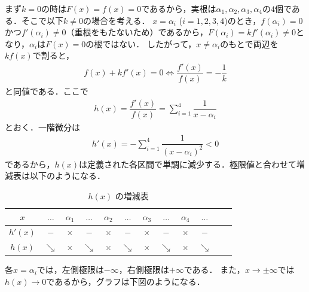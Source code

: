 \documentclass[../../main.tex]{subfiles}
\begin{document}
まず$k=0$の時は$F(x) = f(x) = 0$であるから，実根は$\alpha_1, \alpha_2, \alpha_3, \alpha_4$の$4$個である．そこで以下$k \neq 0$の場合を考える．
$x = \alpha_i$ ($i = 1, 2, 3, 4$)のとき，$f(\alpha_i) = 0$かつ$f'(\alpha_i) \neq 0$（重根をもたないため）であるから，$F(\alpha_i) = kf'(\alpha_i) \neq 0$となり，$\alpha_i$は$F(x) = 0$の根ではない．
したがって，$x \neq \alpha_i$のもとで両辺を$kf(x)$で割ると，
\begin{align}
  f(x) + kf'(x) = 0 \Longleftrightarrow \dfrac{f'(x)}{f(x)} = -\dfrac{1}{k}
\end{align}
と同値である．ここで
\begin{align}
  h(x) = \dfrac{f'(x)}{f(x)} = \sum_{i=1}^4 \dfrac{1}{x - \alpha_i}
\end{align}
とおく．一階微分は
\begin{align}
  h'(x) = -\sum_{i=1}^4 \dfrac{1}{(x - \alpha_i)^2} < 0
\end{align}
であるから，$h(x)$は定義された各区間で単調に減少する．極限値と合わせて増減表は以下のようになる．
\begin{table}[htb]
  \centering
  \caption{$h(x)$ の増減表}
  \renewcommand{\arraystretch}{1.3}
  \begin{tabular}{c|c|c|c|c|c|c|c|c|c|c|c}
    $x$ & $\dots$ & $\alpha_1$ & $\dots$ & $\alpha_2$ & $\dots$ & $\alpha_3$ & $\dots$ & $\alpha_4$ & $\dots$ \\ \hline
    $h'(x)$ & $-$ & $\times$ & $-$ & $\times$ & $-$ & $\times$ & $-$ & $\times$ & $-$ \\ \hline
    $h(x)$ & $\searrow$ & $\times$ & $\searrow$ & $\times$ & $\searrow$ & $\times$ & $\searrow$ & $\times$ & $\searrow$
  \end{tabular}
\end{table}

各$x=\alpha_i$では，左側極限は$-\infty$，右側極限は$+\infty$である．
また，$x\to\pm\infty$では$h(x)\to 0$であるから，グラフは下図のようになる．
\end{document}
